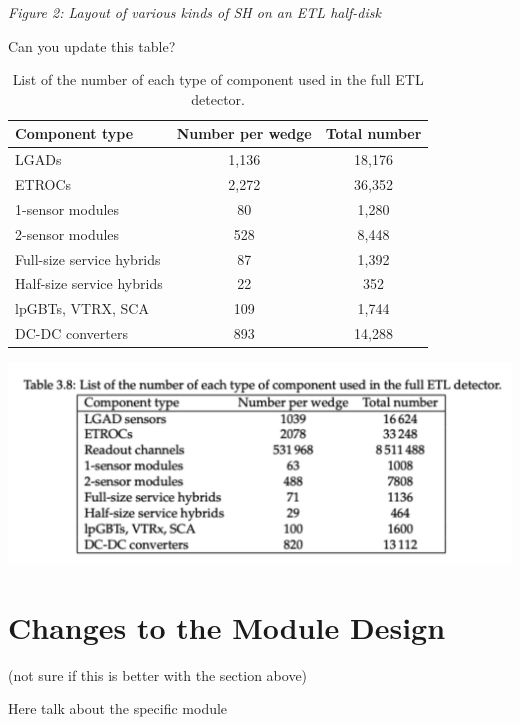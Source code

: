 \documentclass[11pt]{article}
\begin{document}
\emph{Figure 2: Layout of various kinds of SH on an ETL half-disk}

Can you update this table?

\begin{table}
  \caption{List of the number of each type of component used in the full ETL detector.}
  \centering
  \begin{tabular}{ l c c }
    Component type             & Number per wedge & Total number \\
    \midrule
    LGADs                     & 1,136            & 18,176       \\
    ETROCs                    & 2,272            & 36,352       \\
    1-sensor modules          & 80               & 1,280        \\
    2-sensor modules          & 528              & 8,448        \\
    Full-size service hybrids & 87               & 1,392        \\
    Half-size service hybrids & 22               & 352          \\
    lpGBTs, VTRX, SCA         & 109              & 1,744        \\
    DC-DC converters          & 893              & 14,288       \\ %
  \end{tabular}
  \label{tab:ETLNumberOfComponents}
\end{table}

\includegraphics[width=\linewidth]{figures/image1.pdf}

\section{Changes to the Module Design}

(not sure if this is better with the section above)

Here talk about the specific module
\end{document}
